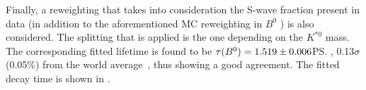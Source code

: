 Finally, a reweighting that takes into consideration the S-wave fraction present in
data (in addition to the aforementioned MC reweighting in $B^0$ \pt) is also
considered. %
The splitting that is applied is the one depending on the $K^{*0}$
mass. The corresponding fitted lifetime is found to be  $\tau(B^0) =
1.519\pm0.006$\ps, 0.13$\sigma$ (0.05\%) from the world average~\cite{HFLAV2017},
thus showing a good agreement. The fitted decay time is shown in
. 

\begin{table}[th]
\caption{\label{tab:tauB0}\small Values of $\tau(B^{0})$ obtained for validation of the time acceptance method for the different considered splittings, with (first column) and without reweighting MC in $p_{T}^{B}$.}
\end{table}

